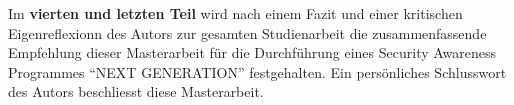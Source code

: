 \documentclass[../../main.tex]{subfiles}
\begin{document}
\begin{sloppypar}


Im \textbf{vierten und letzten Teil} wird nach einem Fazit und einer kritischen Eigenreflexionn des Autors zur gesamten Studienarbeit die zusammenfassende Empfehlung dieser Masterarbeit für die Durchführung eines Security Awareness Programmes "`NEXT GENERATION"' festgehalten. Ein persönliches Schlusswort des Autors beschliesst diese  Masterarbeit.

\end{sloppypar}
\end{document}
